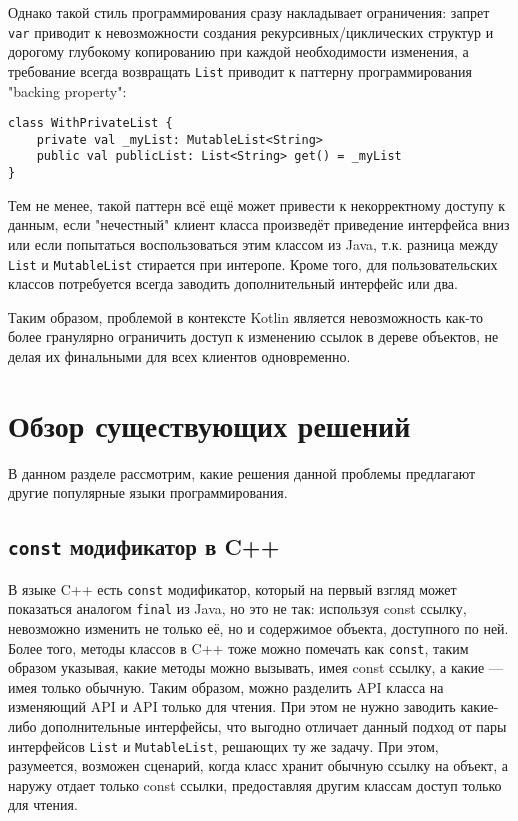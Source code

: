 \documentclass[specification,annotation,times]{itmo-student-thesis}
\begin{document}
Однако такой стиль программирования сразу накладывает ограничения: запрет \texttt{var} приводит к невозможности создания рекурсивных/циклических структур и дорогому глубокому копированию при каждой необходимости изменения, а требование всегда возвращать \texttt{List} приводит к паттерну программирования "backing property":

\begin{lstlisting}[float=h!,caption={Backing property},label={backing_property}]
class WithPrivateList {
	private val _myList: MutableList<String>
	public val publicList: List<String> get() = _myList
}
\end{lstlisting}

Тем не менее, такой паттерн всё ещё может привести к некорректному доступу к данным, если "нечестный" клиент класса произведёт приведение интерфейса вниз или если попытаться воспользоваться этим классом из Java, т.к. разница между \texttt{List} и \texttt{MutableList} стирается при интеропе.
Кроме того, для пользовательских классов потребуется всегда заводить дополнительный интерфейс или два.

Таким образом, проблемой в контексте Kotlin является невозможность как-то более гранулярно ограничить доступ к изменению ссылок в дереве объектов, не 
делая их финальными для всех клиентов одновременно.

\section{Обзор существующих решений}

В данном разделе рассмотрим, какие решения данной проблемы предлагают другие популярные языки программирования.

\subsection{\texttt{const} модификатор в C++}

В языке C++ есть \texttt{const} модификатор, который на первый взгляд может показаться аналогом \texttt{final} из Java, но это не так: используя const ссылку, невозможно изменить не только её, но и содержимое объекта, доступного по ней. Более того, методы классов в C++ тоже можно помечать как \texttt{const}, таким образом указывая, какие методы можно вызывать, имея const ссылку, а какие --- имея только обычную.
Таким образом, можно разделить API класса на изменяющий API и API только для чтения. При этом не нужно заводить какие-либо дополнительные интерфейсы, что выгодно отличает данный подход от пары интерфейсов \texttt{List} и \texttt{MutableList}, решающих ту же задачу.
При этом, разумеется, возможен сценарий, когда класс хранит обычную ссылку на объект, а наружу отдает только const ссылки, предоставляя другим классам доступ только для чтения.
\end{document}
